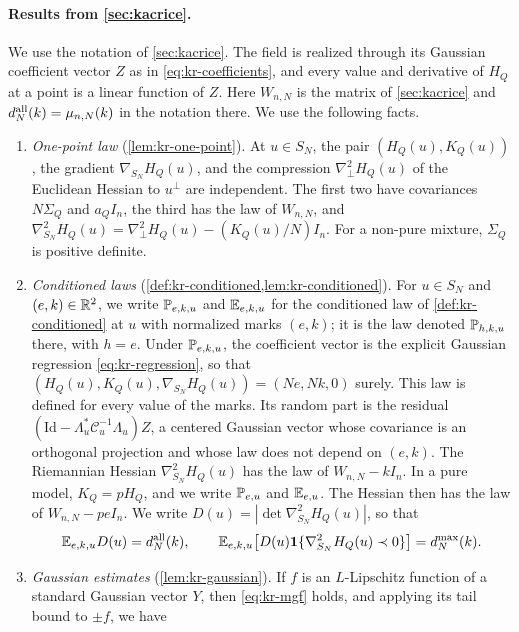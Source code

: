 \paragraph{Results from \cref{sec:kacrice}.}
We use the notation of \cref{sec:kacrice}. The field is realized through its Gaussian coefficient vector $Z$ as in \eqref{eq:kr-coefficients}, and every value and derivative of $H_Q$ at a point is a linear function of $Z$. Here $W_{n,N}$ is the matrix of \cref{sec:kacrice} and $d_N^{\rm all}(k)=\mu_{n,N}(k)$ in the notation there. We use the following facts.
\begin{enumerate}
\item[(1)] \emph{One-point law} (\cref{lem:kr-one-point}). At $u\in S_N$, the pair $(H_Q(u),K_Q(u))$, the gradient $\nabla_{S_N}H_Q(u)$, and the compression $\nabla^2_\perp H_Q(u)$ of the Euclidean Hessian to $u^\perp$ are independent. The first two have covariances $N\Sigma_Q$ and $a_QI_n$, the third has the law of $W_{n,N}$, and $\nabla_{S_N}^2H_Q(u)=\nabla^2_\perp H_Q(u)-(K_Q(u)/N)I_n$. For a non-pure mixture, $\Sigma_Q$ is positive definite.
\item[(2)] \emph{Conditioned laws} (\cref{def:kr-conditioned,lem:kr-conditioned}). For $u\in S_N$ and $(e,k)\in\mathbb R^2$, we write $\mathbb P_{e,k,u}$ and $\mathbb E_{e,k,u}$ for the conditioned law of \cref{def:kr-conditioned} at $u$ with normalized marks $(e,k)$; it is the law denoted $\mathbb P_{h,k,u}$ there, with $h=e$. Under $\mathbb P_{e,k,u}$, the coefficient vector is the explicit Gaussian regression \eqref{eq:kr-regression}, so that $(H_Q(u),K_Q(u),\nabla_{S_N}H_Q(u))=(Ne,Nk,0)$ surely. This law is defined for every value of the marks. Its random part is the residual $(\mathrm{Id}-\Lambda_u^*\mathcal C_u^{-1}\Lambda_u)Z$, a centered Gaussian vector whose covariance is an orthogonal projection and whose law does not depend on $(e,k)$. The Riemannian Hessian $\nabla_{S_N}^2H_Q(u)$ has the law of $W_{n,N}-kI_n$. In a pure model, $K_Q=pH_Q$, and we write $\mathbb P_{e,u}$ and $\mathbb E_{e,u}$. The Hessian then has the law of $W_{n,N}-peI_n$. We write $D(u)=|\det\nabla_{S_N}^2H_Q(u)|$, so that
\begin{equation}\label{eq:mo-Dlaw}
\mathbb E_{e,k,u}D(u)=d_N^{\rm all}(k),\qquad \mathbb E_{e,k,u}\bigl[D(u)\mathbf 1\{\nabla_{S_N}^2H_Q(u)\prec0\}\bigr]=d_N^{\max}(k).
\end{equation}
\item[(3)] \emph{Gaussian estimates} (\cref{lem:kr-gaussian}). If $f$ is an $L$-Lipschitz function of a standard Gaussian vector $Y$, then \eqref{eq:kr-mgf} holds, and applying its tail bound to $\pm f$, we have

\end{enumerate}
